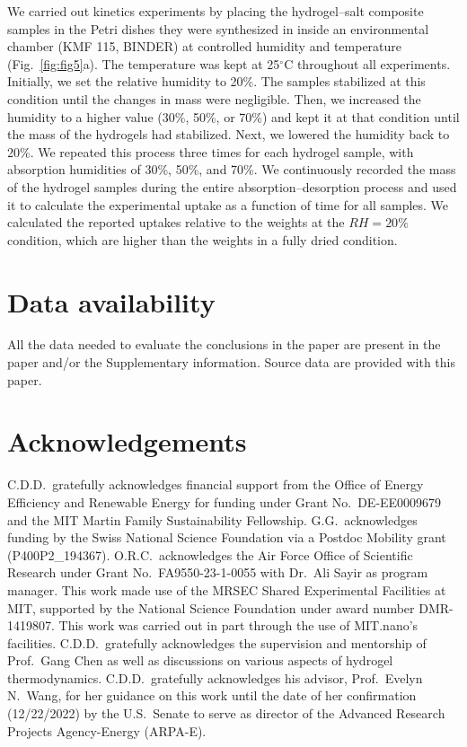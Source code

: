 \documentclass[11pt]{article}
\begin{document}
We carried out kinetics experiments by placing the hydrogel--salt composite samples in the Petri dishes they were synthesized in inside an environmental chamber (KMF 115, BINDER) at controlled humidity and temperature (Fig.~\ref{fig:fig5}a). The temperature was kept at 25$^\circ$C throughout all experiments. Initially, we set the relative humidity to 20\%. The samples stabilized at this condition until the changes in mass were negligible. Then, we increased the humidity to a higher value (30\%, 50\%, or 70\%) and kept it at that condition until the mass of the hydrogels had stabilized. Next, we lowered the humidity back to 20\%. We repeated this process three times for each hydrogel sample, with absorption humidities of 30\%, 50\%, and 70\%. We continuously recorded the mass of the hydrogel samples during the entire absorption--desorption process and used it to calculate the experimental uptake as a function of time for all samples. We calculated the reported uptakes relative to the weights at the $RH = 20\%$ condition, which are higher than the weights in a fully dried condition.

\section*{Data availability}
All the data needed to evaluate the conclusions in the paper are present in the paper and/or the Supplementary information. Source data are provided with this paper.

\section*{Acknowledgements}
C.D.D.\ gratefully acknowledges financial support from the Office of Energy Efficiency and Renewable Energy for funding under Grant No.\ DE-EE0009679 and the MIT Martin Family Sustainability Fellowship. G.G.\ acknowledges funding by the Swiss National Science Foundation via a Postdoc Mobility grant (P400P2\_194367). O.R.C.\ acknowledges the Air Force Office of Scientific Research under Grant No.\ FA9550-23-1-0055 with Dr.\ Ali Sayir as program manager. This work made use of the MRSEC Shared Experimental Facilities at MIT, supported by the National Science Foundation under award number DMR-1419807. This work was carried out in part through the use of MIT.nano's facilities. C.D.D.\ gratefully acknowledges the supervision and mentorship of Prof.\ Gang Chen as well as discussions on various aspects of hydrogel thermodynamics. C.D.D.\ gratefully acknowledges his advisor, Prof.\ Evelyn N.\ Wang, for her guidance on this work until the date of her confirmation (12/22/2022) by the U.S.\ Senate to serve as director of the Advanced Research Projects Agency-Energy (ARPA-E).
\end{document}
